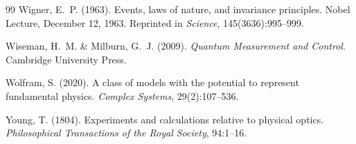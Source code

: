 \documentclass[12pt,a4paper]{article}
\theoremstyle{definition}
\theoremstyle{remark}
\begin{document}
\begin{thebibliography}{99}
Wigner, E.~P. (1963).
\newblock Events, laws of nature, and invariance principles.
\newblock Nobel Lecture, December 12, 1963.
\newblock Reprinted in \textit{Science}, 145(3636):995--999.

Wiseman, H.~M. \& Milburn, G.~J. (2009).
\newblock \textit{Quantum Measurement and Control}.
\newblock Cambridge University Press.

Wolfram, S. (2020).
\newblock A class of models with the potential to represent fundamental physics.
\newblock \textit{Complex Systems}, 29(2):107--536.

Young, T. (1804).
\newblock Experiments and calculations relative to physical optics.
\newblock \textit{Philosophical Transactions of the Royal Society}, 94:1--16.

\end{thebibliography}
\end{document}
